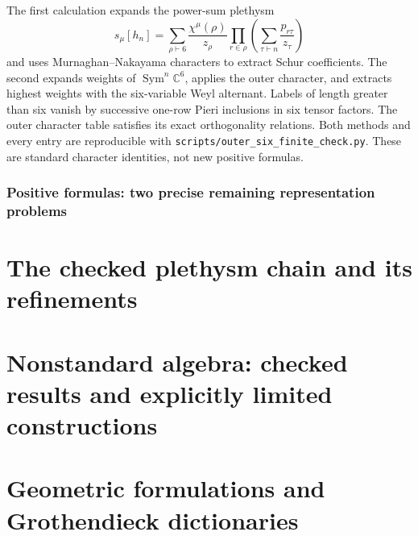 \documentclass[11pt]{article}
\theoremstyle{definition}\newtheorem{definition}[theorem]{Definition}
\theoremstyle{remark}\newtheorem{remark}[theorem]{Remark}
\begin{document}
The first calculation expands the power-sum plethysm
\[
 s_\mu[h_n]=\sum_{\rho\vdash6}\frac{\chi^\mu(\rho)}{z_\rho}
 \prod_{r\in\rho}\left(\sum_{\tau\vdash n}\frac{p_{r\tau}}{z_\tau}\right)
\]
and uses Murnaghan--Nakayama characters to extract Schur coefficients.
The second expands weights of $\operatorname{Sym}^n\mathbb C^6$,
applies the outer character, and extracts highest weights with the
six-variable Weyl alternant. Labels of length greater than six vanish
by successive one-row Pieri inclusions in six tensor factors. The outer
character table satisfies its exact orthogonality relations. Both
methods and every entry are reproducible with
\texttt{scripts/outer\_six\_finite\_check.py}. These are standard
character identities, not new positive formulas.



\section{Positive formulas: two precise remaining representation problems}




\part{The checked plethysm chain and its refinements}


\part{Nonstandard algebra: checked results and explicitly limited constructions}








\part{Geometric formulations and Grothendieck dictionaries}

\end{document}
